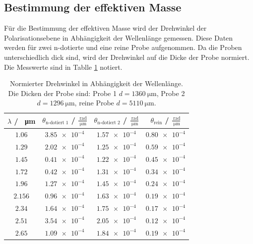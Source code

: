 \subsection{Bestimmung der effektiven Masse}
Für die Bestimmung der effektiven Masse wird der Drehwinkel der Polarisationsebene in Abhängigkeit der Wellenlänge gemessen.
Diese Daten werden für zwei n-dotierte und eine reine Probe aufgenommen. Da die Proben unterschiedlich dick sind, wird 
der Drehwinkel auf die Dicke der Probe normiert.
Die Messwerte sind in Tablle \ref{tab:Drehwinkel} notiert.
\FloatBarrier
\begin{table}
  \centering
  \begin{tabular}{c c c c}
    \toprule
    $\lambda$ / \SI{}{\micro\meter}& $\theta_{\text{n-dotiert 1}}$ / $\frac{\SI{}{\radian}}{\SI{}{\micro\meter}}$& 
    $\theta_{\text{n-dotiert 2}}$ / $\frac{\SI{}{\radian}}{\SI{}{\micro\meter}}$&
    $\theta_{\text{rein}}$ / $\frac{\SI{}{\radian}}{\SI{}{\micro\meter}}$\\
    \midrule
    $\num{1.06} $&$\num{3.85e-4}$&$\num{1.57e-4}$&$\num{0.80e-4}$\\
    $\num{1.29} $&$\num{2.02e-4}$&$\num{1.25e-4}$&$\num{0.59e-4}$\\
    $\num{1.45} $&$\num{0.41e-4}$&$\num{1.22e-4}$&$\num{0.45e-4}$\\
    $\num{1.72} $&$\num{0.42e-4}$&$\num{1.31e-4}$&$\num{0.34e-4}$\\
    $\num{1.96} $&$\num{1.27e-4}$&$\num{1.45e-4}$&$\num{0.24e-4}$\\
    $\num{2.156}$&$\num{0.96e-4}$&$\num{1.63e-4}$&$\num{0.19e-4}$\\
    $\num{2.34} $&$\num{1.64e-4}$&$\num{1.75e-4}$&$\num{0.17e-4}$\\
    $\num{2.51} $&$\num{3.54e-4}$&$\num{2.05e-4}$&$\num{0.12e-4}$\\
    $\num{2.65} $&$\num{1.09e-4}$&$\num{1.84e-4}$&$\num{0.19e-4}$\\
    \bottomrule
  \end{tabular}
  \caption{Normierter Drehwinkel in Abhängigkeit der Wellenlänge. Die Dicken der Probe sind: Probe 1 $d=\SI{1360}{\micro\meter}$,
  Probe 2 $d=\SI{1296}{\micro\meter}$, reine Probe $d=\SI{5110}{\micro\meter}$.}
  \label{tab:Drehwinkel}
\end{table}
\FloatBarrier
